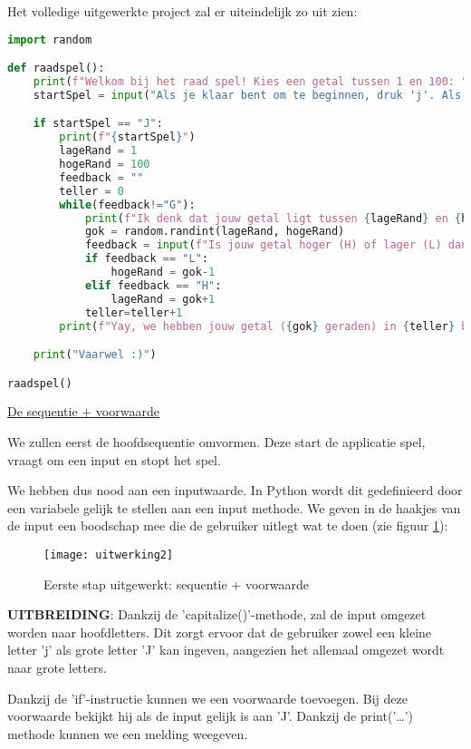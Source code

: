 Het volledige uitgewerkte project zal er uiteindelijk zo uit zien:
\begin{lstlisting}[language=Python, caption=Volledige uitwerking van het raadspel in Python]
import random

def raadspel():
    print(f"Welkom bij het raad spel! Kies een getal tussen 1 en 100: ")
    startSpel = input("Als je klaar bent om te beginnen, druk 'j'. Als je wilt stoppen, druk 'n'.").capitalize()

    if startSpel == "J":
        print(f"{startSpel}")
        lageRand = 1
        hogeRand = 100
        feedback = ""
        teller = 0
        while(feedback!="G"):
            print(f"Ik denk dat jouw getal ligt tussen {lageRand} en {hogeRand}. Ik heb momenteel {teller} keer geraden.")
            gok = random.randint(lageRand, hogeRand)
            feedback = input(f"Is jouw getal hoger (H) of lager (L) dan {gok}? Of heb ik het getal geraden? (G)?: ").capitalize()
            if feedback == "L":
                hogeRand = gok-1
            elif feedback == "H":
                lageRand = gok+1
            teller=teller+1
        print(f"Yay, we hebben jouw getal ({gok} geraden) in {teller} beurten!")

    print("Vaarwel :)")

raadspel()
\end{lstlisting}

\underline{De sequentie + voorwaarde}

We zullen eerst de hoofdsequentie omvormen. Deze start de applicatie spel, vraagt om een input en stopt het spel.

We hebben dus nood aan een inputwaarde. In Python wordt dit gedefinieerd door een variabele gelijk te stellen aan een input methode. We geven in de haakjes van de input een boodschap mee die de gebruiker uitlegt wat te doen (zie figuur \ref{fig:uitwerking2}):

\begin{figure}
    \texttt{[image: uitwerking2]}
    \caption{Eerste stap uitgewerkt: sequentie + voorwaarde}
    \label{fig:uitwerking2}
\end{figure}

\textbf{UITBREIDING}: Dankzij de 'capitalize()'-methode, zal de input omgezet worden naar hoofdletters. Dit zorgt ervoor dat de gebruiker zowel een kleine letter 'j' als grote letter 'J' kan ingeven, aangezien het allemaal omgezet wordt naar grote letters.

Dankzij de 'if'-instructie kunnen we een voorwaarde toevoegen. Bij deze voorwaarde bekijkt hij als de input gelijk is aan 'J'. 
Dankzij de print('…') methode kunnen we een melding weegeven.


